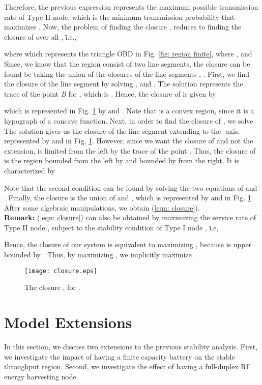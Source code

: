\documentclass[draftcls,12pt,onecolumn]{IEEEtran}
\begin{document}
Therefore, the previous expression represents the maximum possible transmission rate of Type II node, which is the minimum  transmission probability  that maximizes . Now, the problem of finding the closure , reduces to finding the closure of  over all , \.i.e., 

where 
which represents the triangle OBD in Fig. \ref{fig: region finite}, where , and 
\indent Since, we know that the region  consist of two line segments, the closure  can be found be taking the union of the closures of the line segments , . First, we find the closure of the line segment  by solving , and . The solution represents the trace of the point \textit{B} for , which is . Hence, the closure of  is given by 
\vspace{-0.3in}
 
which is represented in Fig. \ref{fig: closure} by  and . Note that  is a convex region, since it is a hypograph of a concave function. 
 Next, in order to find the closure of , we solve  The solution gives us the closure of the line segment extending  to the -axis, represented by  and  in Fig. \ref{fig: closure}. However, since we want the closure of  and not the extension,  is limited from the left by the trace of the point . Thus, the closure of  is the region bounded from the left by  and bounded by  from the right. It is characterized by 
 
Note that the second condition can be found by solving the two equations of  and . Finally, the closure  is the union of  and , which is represented by  and  in Fig. \ref{fig: closure}. After some algebraic manipulations, we obtain (\ref{eqn: closure}).\\
\indent \textbf{Remark:} (\ref{eqn: closure}) can also be obtained by maximizing the service rate of Type II node , subject to the stability condition of Type I node , \.i.e, 

Hence, the closure of our system is equivalent to maximizing , because  is upper bounded by . Thus, by maximizing , we implicitly maximize .  
\begin{figure}[t]
\texttt{[image: closure.eps]}
\centering
\caption{The closure , for . }\label{fig: closure}
\end{figure}
\section{Model Extensions} \label{sec:Extensions}
In this section, we discuss two extensions to the previous stability analysis. First, we investigate the impact of having a finite capacity battery on the stable throughput region. Second, we investigate the effect of having a full-duplex RF energy harvesting node.
\end{document}
